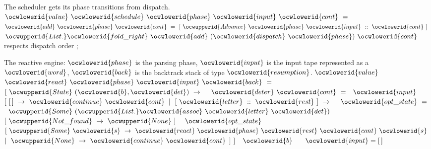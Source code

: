 \documentclass[12pt]{article}
\begin{document}
\ocwendcode{}\ocwindent{0.00em}
The scheduler gets its phase transitions from dispatch. 
\ocweol
\label{../ML/react0.ml:1418}%
\medskip
\ocwbegincode{}\ocwindent{0.00em}
$\ocwlowerid{value}~\ocwlowerid{schedule}~\ocwlowerid{phase}~\ocwlowerid{input}~\ocwlowerid{cont}~=$\ocweol
\ocwindent{1.00em}
~$\ocwlowerid{add}~\ocwlowerid{phase}~\ocwlowerid{cont}~=~[~\ocwupperid{Advance}~\ocwlowerid{phase}~\ocwlowerid{input}~::~\ocwlowerid{cont}~]~$\ocweol
\ocwindent{1.00em}
$\ocwupperid{List.}\ocwlowerid{fold\_right}~\ocwlowerid{add}~(\ocwlowerid{dispatch}~\ocwlowerid{phase})~\ocwlowerid{cont}~$\ocwbc{} respects dispatch order \ocwec{}\ocweol
\ocwindent{0.00em}
;\medskip

\ocwendcode{}\ocwindent{0.00em}
The reactive engine:
   \ocwbegindcode{}$\ocwlowerid{phase}$\ocwenddcode{} is the parsing phase,
   \ocwbegindcode{}$\ocwlowerid{input}$\ocwenddcode{} is the input tape represented as a \ocwbegindcode{}$\ocwlowerid{word}$\ocwenddcode{},
   \ocwbegindcode{}$\ocwlowerid{back}$\ocwenddcode{} is the backtrack stack of type \ocwbegindcode{}$\ocwlowerid{resumption}$\ocwenddcode{}. 
\ocweol
\label{../ML/react0.ml:1757}%
\medskip
\ocwbegincode{}\ocwindent{0.00em}
$\ocwlowerid{value}~$~$\ocwlowerid{react}~\ocwlowerid{phase}~\ocwlowerid{input}~\ocwlowerid{back}~=~$\ocweol
\ocwindent{1.00em}
$[~\ocwupperid{State}~(\ocwlowerid{b},\ocwlowerid{det})~\rightarrow{}~$\ocweol
\ocwindent{2.00em}
~$\ocwlowerid{deter}~\ocwlowerid{cont}~=~$~$\ocwlowerid{input}~$\ocweol
\ocwindent{3.00em}
$[~[\,]~\rightarrow{}~\ocwlowerid{continue}~\ocwlowerid{cont}$\ocweol
\ocwindent{3.00em}
$\mid{}~[~\ocwlowerid{letter}~::~\ocwlowerid{rest}~]~\rightarrow{}~$\ocweol
\ocwindent{4.00em}
~$\ocwlowerid{opt\_state}~=~$~$\ocwupperid{Some}~(\ocwupperid{List.}\ocwlowerid{assoc}~\ocwlowerid{letter}~\ocwlowerid{det})~$\ocweol
\ocwindent{12.00em}
$[~\ocwupperid{Not\_found}~\rightarrow{}~\ocwupperid{None}~]~$\ocweol
\ocwindent{4.00em}
~$\ocwlowerid{opt\_state}~$\ocweol
\ocwindent{4.00em}
$[~\ocwupperid{Some}~\ocwlowerid{s}~\rightarrow{}~\ocwlowerid{react}~\ocwlowerid{phase}~\ocwlowerid{rest}~\ocwlowerid{cont}~\ocwlowerid{s}~$\ocweol
\ocwindent{4.00em}
$\mid{}~\ocwupperid{None}~\rightarrow{}~\ocwlowerid{continue}~\ocwlowerid{cont}$\ocweol
\ocwindent{4.00em}
$]$\ocweol
\ocwindent{3.00em}
$]~$\ocweol
\ocwindent{2.00em}
~$\ocwlowerid{b}~$~\ocweol
\ocwindent{3.00em}
~$\ocwlowerid{input}=[\,]~$~\ocweol
\end{document}
